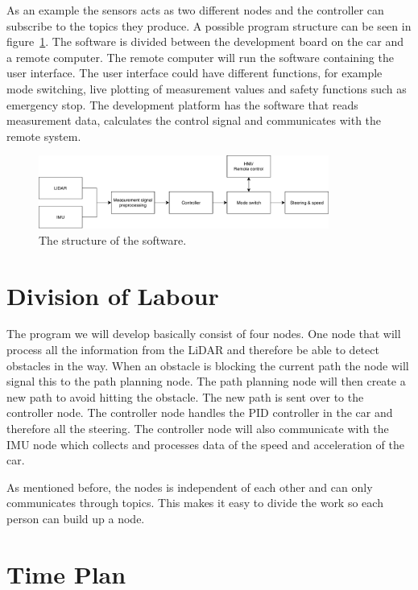 \documentclass{article}
\begin{document}
As an example the sensors acts as two different nodes and the controller can subscribe to the topics they produce. A possible program structure can be seen in figure~\ref{fig:SystemDesign}. The software is divided between the development board on the car and a remote computer. The remote computer will run the software containing the user interface. The user interface could have different functions, for example mode switching, live plotting of measurement values and safety functions such as emergency stop. The development platform has the software that reads measurement data, calculates the control signal and communicates with the remote system.

\begin{figure} [h]
	\centering
 	\includegraphics[width=0.85\textwidth]{figures/FRTN40-SystemDesign}
    \caption{The structure of the software.}
    \label{fig:SystemDesign}
\end{figure}


\section{Division of Labour} \label{sec:division}

The program we will develop basically consist of four nodes. One node that will process all the information from the LiDAR and therefore be able to detect obstacles in the way. When an obstacle is blocking the current path the node will signal this to the path planning node. The path planning node will then create a new path to avoid hitting the obstacle. The new path is sent over to the controller node. The controller node handles the PID controller in the car and therefore all the steering. The controller node will also communicate with the IMU node which collects and processes data of the speed and acceleration of the car. 

As mentioned before, the nodes is independent of each other and can only communicates through topics. This makes it easy to divide the work so each person can build up a node.




\section{Time Plan}
\end{document}
